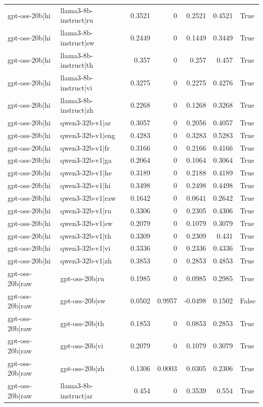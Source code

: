 \begin{table}
\begin{tabular}{l l r r r r l}
gpt-oss-20b|hi & llama3-8b-instruct|ru & 0.3521 & 0 & 0.2521 & 0.4521 & True \\
gpt-oss-20b|hi & llama3-8b-instruct|sw & 0.2449 & 0 & 0.1449 & 0.3449 & True \\
gpt-oss-20b|hi & llama3-8b-instruct|th & 0.357 & 0 & 0.257 & 0.457 & True \\
gpt-oss-20b|hi & llama3-8b-instruct|vi & 0.3275 & 0 & 0.2275 & 0.4276 & True \\
gpt-oss-20b|hi & llama3-8b-instruct|zh & 0.2268 & 0 & 0.1268 & 0.3268 & True \\
gpt-oss-20b|hi & qwen3-32b-v1|ar & 0.3057 & 0 & 0.2056 & 0.4057 & True \\
gpt-oss-20b|hi & qwen3-32b-v1|eng & 0.4283 & 0 & 0.3283 & 0.5283 & True \\
gpt-oss-20b|hi & qwen3-32b-v1|fr & 0.3166 & 0 & 0.2166 & 0.4166 & True \\
gpt-oss-20b|hi & qwen3-32b-v1|ga & 0.2064 & 0 & 0.1064 & 0.3064 & True \\
gpt-oss-20b|hi & qwen3-32b-v1|he & 0.3189 & 0 & 0.2188 & 0.4189 & True \\
gpt-oss-20b|hi & qwen3-32b-v1|hi & 0.3498 & 0 & 0.2498 & 0.4498 & True \\
gpt-oss-20b|hi & qwen3-32b-v1|raw & 0.1642 & 0 & 0.0641 & 0.2642 & True \\
gpt-oss-20b|hi & qwen3-32b-v1|ru & 0.3306 & 0 & 0.2305 & 0.4306 & True \\
gpt-oss-20b|hi & qwen3-32b-v1|sw & 0.2079 & 0 & 0.1079 & 0.3079 & True \\
gpt-oss-20b|hi & qwen3-32b-v1|th & 0.3309 & 0 & 0.2309 & 0.431 & True \\
gpt-oss-20b|hi & qwen3-32b-v1|vi & 0.3336 & 0 & 0.2336 & 0.4336 & True \\
gpt-oss-20b|hi & qwen3-32b-v1|zh & 0.3853 & 0 & 0.2853 & 0.4853 & True \\
gpt-oss-20b|raw & gpt-oss-20b|ru & 0.1985 & 0 & 0.0985 & 0.2985 & True \\
gpt-oss-20b|raw & gpt-oss-20b|sw & 0.0502 & 0.9957 & -0.0498 & 0.1502 & False \\
gpt-oss-20b|raw & gpt-oss-20b|th & 0.1853 & 0 & 0.0853 & 0.2853 & True \\
gpt-oss-20b|raw & gpt-oss-20b|vi & 0.2079 & 0 & 0.1079 & 0.3079 & True \\
gpt-oss-20b|raw & gpt-oss-20b|zh & 0.1306 & 0.0003 & 0.0305 & 0.2306 & True \\
gpt-oss-20b|raw & llama3-8b-instruct|ar & 0.454 & 0 & 0.3539 & 0.554 & True \\

\end{tabular}
\end{table}
